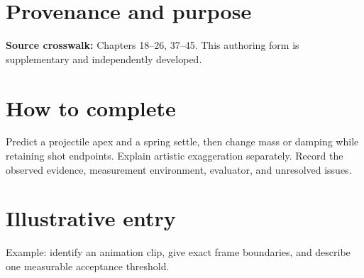 \documentclass[10pt,letterpaper]{article}
\begin{document}
\makedoctitle
\makedocsummary

\section{Provenance and purpose}
\textbf{Source crosswalk:} Chapters 18--26, 37--45. This authoring form is supplementary and independently developed.
\section{How to complete}
Predict a projectile apex and a spring settle, then change mass or damping while retaining shot endpoints. Explain artistic exaggeration separately. Record the observed evidence, measurement environment, evaluator, and unresolved issues. 
\section{Illustrative entry}
Example: identify an animation clip, give exact frame boundaries, and describe one measurable acceptance threshold.
\end{document}
